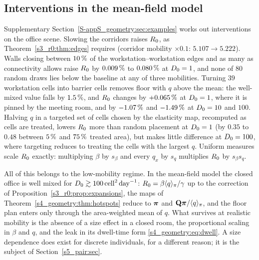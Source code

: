 \subsection{Interventions in the mean-field model}\label{s4_geometry:sec:examples}

Supplementary Section~\ref{S-appS_geometry:sec:examples} works out interventions on the office scene. Slowing
the corridors raises $R_0$, as Theorem~\ref{s3_r0:thm:edges} requires (corridor mobility $\times0.1$:
$5.107\to5.222$). Walls closing between $10\,\%$ of the workstation--workstation edges and as many as
connectivity allows raise $R_0$ by $0.009\,\%$ to $0.080\,\%$ at $D_0=1$, and none of $80$ random draws lies
below the baseline at any of three mobilities. Turning $39$ workstation cells into barrier cells removes floor
with $q$ above the mean: the well-mixed value falls by $1.5\,\%$, and $R_0$ changes by $+0.065\,\%$ at $D_0=1$,
where it is pinned by the meeting room, and by $-1.07\,\%$ and $-1.49\,\%$ at $D_0=10$ and $100$. Halving $q$ in
a targeted set of cells chosen by the elasticity map, recomputed as cells are treated, lowers $R_0$ more than
random placement at $D_0=1$ (by $0.35$ to $0.48$ between $5\,\%$ and $75\,\%$ treated area), but makes little
difference at $D_0=100$, where targeting reduces to treating the cells with the largest $q$. Uniform measures
scale $R_0$ exactly: multiplying $\beta$ by $s_\beta$ and every $q_x$ by $s_q$ multiplies $R_0$ by $s_\beta s_q$.

All of this belongs to the low-mobility regime. In the mean-field model the closed office is well mixed for
$D_0\gtrsim100\,\mathrm{cell}^2\,\mathrm{day}^{-1}$: $R_0=\beta\langle q\rangle_{\pi}/\gamma$ up to the correction of Proposition~\ref{s3_r0:prop:expansions},
the maps of Theorem~\ref{s4_geometry:thm:hotspots} reduce to $\boldsymbol{\pi}$ and $\mathbf{Q}\boldsymbol{\pi}/\langle q\rangle_{\pi}$, and the floor plan
enters only through the area-weighted mean of $q$. What survives at realistic mobility is the absence of a
size effect in a closed room, the proportional scaling in $\beta$ and $q$, and the leak in its dwell-time form
\eqref{s4_geometry:eq:dwell}. A size dependence does exist for discrete individuals, for a different reason;
it is the subject of Section~\ref{s5_pair:sec}.
